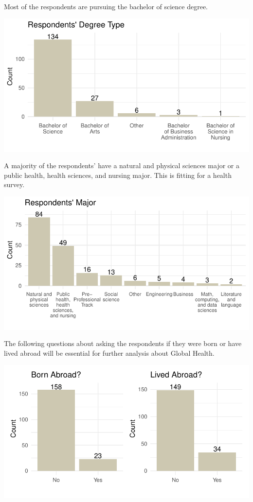 \documentclass[
  letterpaper,
  DIV=11,
  numbers=noendperiod]{scrartcl}
\begin{document}
\newpage

Most of the respondents are pursuing the bachelor of science degree.

\includegraphics{GlobalHealthQuartoHC_files/figure-pdf/unnamed-chunk-9-1.pdf}

A majority of the respondents' have a natural and physical sciences
major or a public health, health sciences, and nursing major. This is
fitting for a health survey.

\includegraphics{GlobalHealthQuartoHC_files/figure-pdf/unnamed-chunk-10-1.pdf}

\newpage

The following questions about asking the respondents if they were born
or have lived abroad will be essential for further analysis about Global
Health.

\includegraphics{GlobalHealthQuartoHC_files/figure-pdf/unnamed-chunk-11-1.pdf}
\end{document}
